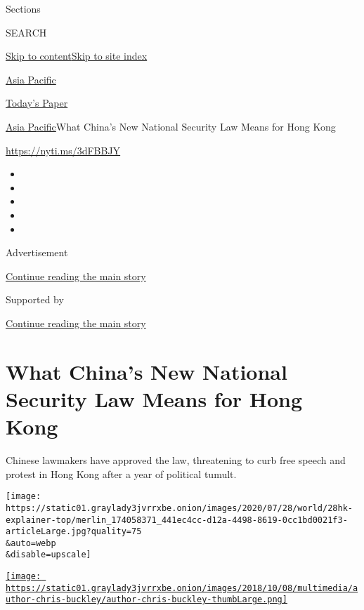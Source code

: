 Sections

SEARCH

\protect\hyperlink{site-content}{Skip to
content}\protect\hyperlink{site-index}{Skip to site index}

\href{https://www.nytimes3xbfgragh.onion/section/world/asia}{Asia
Pacific}

\href{https://myaccount.nytimes3xbfgragh.onion/auth/login?response_type=cookie\&client_id=vi}{}

\href{https://www.nytimes3xbfgragh.onion/section/todayspaper}{Today's
Paper}

\href{/section/world/asia}{Asia Pacific}\textbar{}What China's New
National Security Law Means for Hong Kong

\url{https://nyti.ms/3dFBBJY}

\begin{itemize}
\item
\item
\item
\item
\item
\end{itemize}

Advertisement

\protect\hyperlink{after-top}{Continue reading the main story}

Supported by

\protect\hyperlink{after-sponsor}{Continue reading the main story}

\hypertarget{what-chinas-new-national-security-law-means-for-hong-kong}{%
\section{What China's New National Security Law Means for Hong
Kong}\label{what-chinas-new-national-security-law-means-for-hong-kong}}

Chinese lawmakers have approved the law, threatening to curb free speech
and protest in Hong Kong after a year of political tumult.

\texttt{[image: https://static01.graylady3jvrrxbe.onion/images/2020/07/28/world/28hk-explainer-top/merlin\_174058371\_441ec4cc-d12a-4498-8619-0cc1bd0021f3-articleLarge.jpg?quality=75\\\&auto=webp\\\&disable=upscale]}

\href{https://www.nytimes3xbfgragh.onion/by/chris-buckley}{\texttt{[image: https://static01.graylady3jvrrxbe.onion/images/2018/10/08/multimedia/author-chris-buckley/author-chris-buckley-thumbLarge.png]}}

